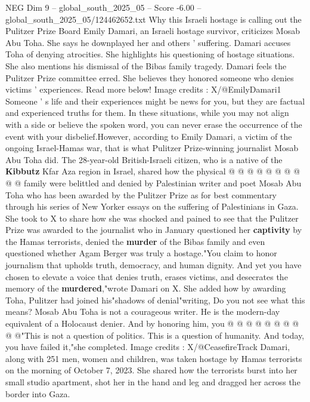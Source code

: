 \begin{textsample}{NEG Dim 9 – global\_south\_2025\_05 – Score -6.00 – global\_south\_2025\_05/124462652.txt}  \label{ex:f9_neg_221}
Why this Israeli hostage is calling out the Pulitzer Prize Board Emily Damari, an Israeli hostage survivor, criticizes Mosab Abu Toha.
She says he downplayed her and others ' suffering.
Damari accuses Toha of denying atrocities.
She highlights his questioning of hostage situations.
She also mentions his dismissal of the Bibas family tragedy.
Damari feels the Pulitzer Prize committee erred.
She believes they honored someone who denies victims ' experiences.
Read more below!
Image credits : X/@EmilyDamari1 Someone ' s life and their experiences might be news for you, but they are factual and experienced truths for them.
In these situations, while you may not align with a side or believe the spoken word, you can never erase the occurrence of the event with your disbelief.However, according to Emily Damari, a victim of the ongoing Israel-Hamas war, that is what Pulitzer Prize-winning journalist Mosab Abu Toha did.
The 28-year-old British-Israeli citizen, who is a native of the \textbf{Kibbutz} Kfar Aza region in Israel, shared how the physical @ @ @ @ @ @ @ @ @ @ family were belittled and denied by Palestinian writer and poet Mosab Abu Toha who has been awarded by the Pulitzer Prize as for best commentary through his series of New Yorker essays on the suffering of Palestinians in Gaza.
She took to X to share how she was shocked and pained to see that the Pulitzer Prize was awarded to the journalist who in January questioned her \textbf{captivity} by the Hamas terrorists, denied the \textbf{murder} of the Bibas family and even questioned whether Agam Berger was truly a hostage."You claim to honor journalism that upholds truth, democracy, and human dignity.
And yet you have chosen to elevate a voice that denies truth, erases victims, and desecrates the memory of the \textbf{murdered},"wrote Damari on X.
She added how by awarding Toha, Pulitzer had joined his"shadows of denial"writing, Do you not see what this means?
Mosab Abu Toha is not a courageous writer.
He is the modern-day equivalent of a Holocaust denier.
And by honoring him, you @ @ @ @ @ @ @ @ @ @"This is not a question of politics.
This is a question of humanity.
And today, you have failed it,"she completed.
Image credits : X/@CeasefireTrack Damari, along with 251 men, women and children, was taken hostage by Hamas terrorists on the morning of October 7, 2023.
She shared how the terrorists burst into her small studio apartment, shot her in the hand and leg and dragged her across the border into Gaza.

\end{textsample}
